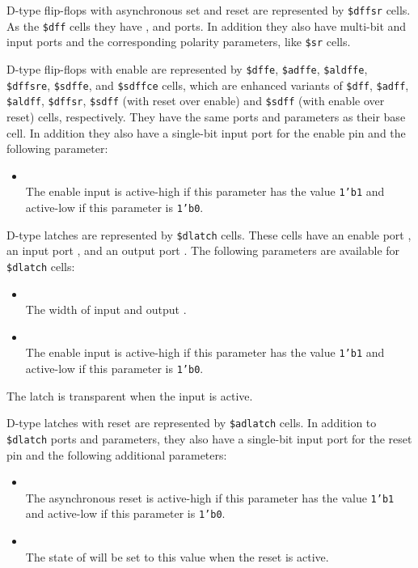 D-type flip-flops with asynchronous set and reset are represented by {\tt \$dffsr} cells.
As the {\tt \$dff} cells they have ,  and  ports. In addition they also have
multi-bit  and  input ports and the corresponding polarity parameters, like 
{\tt \$sr} cells.

D-type flip-flops with enable are represented by {\tt \$dffe}, {\tt \$adffe}, {\tt \$aldffe}, {\tt \$dffsre},
{\tt \$sdffe}, and {\tt \$sdffce} cells, which are enhanced variants of {\tt \$dff}, {\tt \$adff}, {\tt \$aldff}, {\tt \$dffsr},
{\tt \$sdff} (with reset over enable) and {\tt \$sdff} (with enable over reset)
cells, respectively.  They have the same ports and parameters as their base cell.
In addition they also have a single-bit  input port for the enable pin and the following parameter:

\begin{itemize}
\item {} \\
The enable input is active-high if this parameter has the value {\tt 1'b1} and active-low
if this parameter is {\tt 1'b0}.
\end{itemize}

D-type latches are represented by {\tt \$dlatch} cells.  These cells have an enable port ,
an input port , and an output port .  The following parameters are available for {\tt \$dlatch} cells:

\begin{itemize}
\item {} \\
The width of input  and output .

\item {} \\
The enable input is active-high if this parameter has the value {\tt 1'b1} and active-low
if this parameter is {\tt 1'b0}.
\end{itemize}

The latch is transparent when the  input is active.

D-type latches with reset are represented by {\tt \$adlatch} cells.  In addition to {\tt \$dlatch}
ports and parameters, they also have a single-bit  input port for the reset pin and the following additional parameters:

\begin{itemize}
\item {} \\
The asynchronous reset is active-high if this parameter has the value {\tt 1'b1} and active-low
if this parameter is {\tt 1'b0}.

\item {} \\
The state of  will be set to this value when the reset is active.
\end{itemize}

